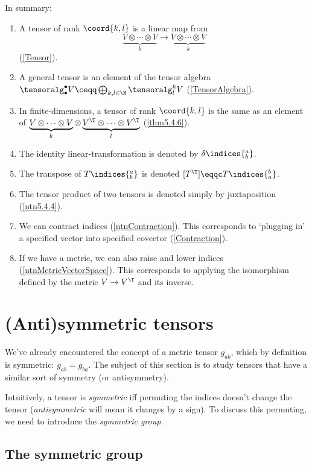 In summary:
\begin{enumerate}
	\item A tensor of rank $\coord{k,l}$ is a linear map from
	\begin{equation}
		\underbrace{V\otimes \cdots \otimes V}_k\rightarrow \underbrace{V\otimes \cdots \otimes V}_k
	\end{equation}
	(\cref{Tensor}).
	\item A general tensor is an element of the tensor algebra $\tensoralg _{\bullet}^{\bullet}V\ceqq \bigoplus _{k,l\in \N}\tensoralg _l^kV$ (\cref{TensorAlgebra}).
	\item In finite-dimensions, a tensor of rank $\coord{k,l}$ is the same as an element of $\underbrace{V\otimes \cdots \otimes V}_k\otimes \underbrace{V^{\T}\otimes \cdots \otimes V^{\T}}_l$ (\cref{thm5.4.6}).
	\item The identity linear-transformation is denoted by $\delta \indices{^a_b}$.
	\item The transpose of $T\indices{^a_b}$ is denoted $[T^{\T}]\eqqc T\indices{_a^b}$.
	\item The tensor product of two tensors is denoted simply by juxtaposition (\cref{ntn5.4.4}).
	\item We can contract indices (\cref{ntnContraction}).  This corresponds to `plugging in' a specified vector into  specified covector (\cref{Contraction}).
	\item If we have a metric, we can also raise and lower indices (\cref{ntnMetricVectorSpace}).  This corresponds to applying the isomorphism defined by the metric $V\rightarrow V^{\T}$ and its inverse.
\end{enumerate}

\section{(Anti)symmetric tensors}

We've already encountered the concept of a metric tensor $g_{ab}$, which by definition is symmetric:  $g_{ab}=g_{ba}$.  The subject of this section is to study tensors that have a similar sort of symmetry (or antisymmetry).

Intuitively, a tensor is \emph{symmetric} iff permuting the indices doesn't change the tensor (\emph{antisymmetric} will mean it changes by a sign).  To discuss this permuting, we need to introduce the \emph{symmetric group}.

\subsection{The symmetric group}

